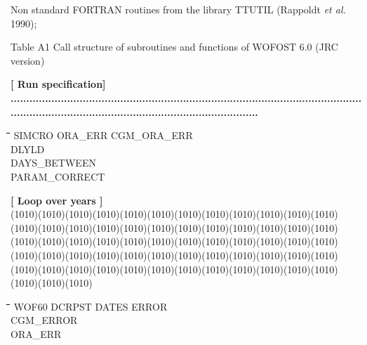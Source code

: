 \documentclass[11pt]{article}
\begin{document}
\begin{indenting}{1.27cm}
Non standard FORTRAN routines from the library TTUTIL (Rappoldt {\it et al.\/}
1990);
\end{indenting}

Table A1 Call structure of subroutines and functions of WOFOST 6.0 (JRC version)

\strut\hfill {\bf [ Run specification]}
{\bf ...............................................................................................................................................................................................\-}
\begin{tabbing}
\hspace{1.27cm}\=\hspace{1.27cm}\=\hspace{1.27cm}\=\hspace{1.27cm}\=%
\hspace{1.27cm}\=\hspace{1.27cm}\=\hspace{1.27cm}\=\hspace{1.27cm}\=%
\hspace{1.27cm}\=\hspace{1.27cm}\=\kill
SIMCRO\> ORA\_ERR\> \> CGM\_ORA\_ERR\\
\>DLYLD\\
\>DAYS\_BETWEEN\\
\>PARAM\_CORRECT
\end{tabbing}
\strut\hfill {\bf [ Loop over years ]}\\
 \GrBox(1010)\GrBox(1010)\GrBox(1010)\GrBox(1010)\GrBox(1010)\GrBox(1010)\GrBox(1010)\GrBox(1010)\GrBox(1010)\GrBox(1010)\GrBox(1010)\GrBox(1010)\GrBox(1010)\GrBox(1010)\GrBox(1010)\GrBox(1010)\GrBox(1010)\GrBox(1010)\GrBox(1010)\GrBox(1010)\GrBox(1010)\GrBox(1010)\GrBox(1010)\GrBox(1010)\GrBox(1010)\GrBox(1010)\GrBox(1010)\GrBox(1010)\GrBox(1010)\GrBox(1010)\GrBox(1010)\GrBox(1010)\GrBox(1010)\GrBox(1010)\GrBox(1010)\GrBox(1010)\GrBox(1010)\GrBox(1010)\GrBox(1010)\GrBox(1010)\GrBox(1010)\GrBox(1010)\GrBox(1010)\GrBox(1010)\GrBox(1010)\GrBox(1010)\GrBox(1010)\GrBox(1010)\GrBox(1010)\GrBox(1010)\GrBox(1010)\GrBox(1010)\GrBox(1010)\GrBox(1010)\GrBox(1010)\GrBox(1010)\GrBox(1010)\GrBox(1010)\GrBox(1010)\GrBox(1010)\GrBox(1010)\GrBox(1010)\GrBox(1010)\nwln
\begin{tabbing}
\hspace{1.27cm}\=\hspace{1.27cm}\=\hspace{1.27cm}\=\hspace{1.27cm}\=%
\hspace{1.27cm}\=\hspace{1.27cm}\=\hspace{1.27cm}\=\hspace{1.27cm}\=%
\hspace{1.27cm}\=\hspace{1.27cm}\=\kill
\>WOF60\> \> DCRPST\> \> DATES\> \> ERROR\\
\>\> \> \> \> CGM\_ERROR\\
\>\> \> \> \> ORA\_ERR
\end{tabbing}
\end{document}
